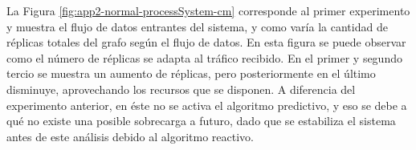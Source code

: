 %
%
%
%
%


La Figura \ref{fig:app2-normal-processSystem-cm} \normalsize{corresponde al primer experimento y muestra el flujo de datos entrantes del sistema, y como varía la cantidad de réplicas totales del grafo según el flujo de datos.} En esta figura \normalsize{se puede observar como el número de réplicas se adapta al tráfico recibido. En el primer y segundo tercio se muestra un aumento de réplicas, pero posteriormente en el último disminuye, aprovechando los recursos que se disponen. A diferencia del experimento anterior, en éste no se activa el algoritmo predictivo, y eso se debe a qué no existe una posible sobrecarga a futuro, dado que se estabiliza el sistema antes de este análisis debido al algoritmo reactivo.}

